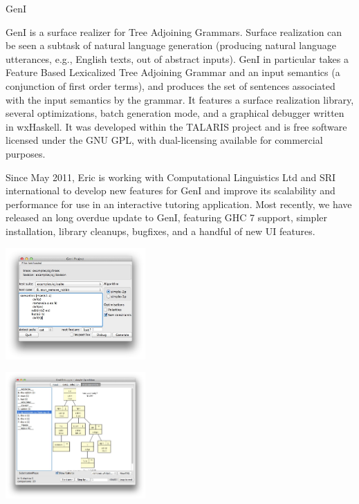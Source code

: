 \begin{hcarentry}{GenI}
\label{geni}
\makeheader

GenI is a surface realizer for Tree Adjoining Grammars.  Surface
realization can be seen a subtask of natural language generation
(producing natural language utterances, e.g., English texts, out of
abstract inputs).  GenI in particular takes a Feature Based
Lexicalized Tree Adjoining Grammar and an
input semantics (a conjunction of first order terms), and produces the
set of sentences associated with the input semantics by the grammar.  It
features a surface realization library, several optimizations, batch
generation mode, and a graphical debugger written in wxHaskell.  It was
developed within the TALARIS project and is free software licensed under
the GNU GPL, with dual-licensing available for commercial purposes.

Since May 2011, Eric is working with Computational Linguistics Ltd and
SRI international to develop new features for GenI and improve its
scalability and performance for use in an interactive tutoring
application.  Most recently, we have released an long overdue update to
GenI, featuring GHC 7 support, simpler installation, library cleanups,
bugfixes, and a handful of new UI features.

\begin{center}
\includegraphics[width=0.4\textwidth]{html/GenI-main-screenshot.jpg}
\end{center}

\begin{center}
\includegraphics[width=0.4\textwidth]{html/GenI-debugger-screenshot.jpg}
\end{center}


\end{hcarentry}
